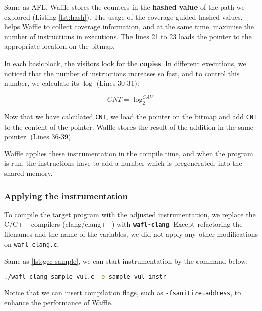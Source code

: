 Same as AFL, Waffle stores the counters in the \textbf{hashed value} of the path we explored (Listing \ref{lst:hash}). The usage of the coverage-guided hashed values, helps Waffle to collect coverage information, and at the same time, maximise the number of instructions in executions. The lines 21 to 23 loads the pointer to the appropriate location on the bitmap.

In each basicblock, the visitors look for the \textbf{copies}. In different executions, we noticed that the number of instructions increases so fast, and to control this number, we calculate its $\log$ (Lines 30-31):

\begin{equation}
  \label{eq:log}
  CNT = \log_{2}^{CAV} 
\end{equation}

Now that we have calculated \texttt{CNT}, we load the pointer on the bitmap and add \texttt{CNT} to the content of the pointer. Waffle stores the result of the addition in the same pointer. (Lines 36-39)

Waffle applies these instrumentation in the compile time, and when the program is run, the instructions have to add a number which is pregenerated, into the shared memory.

\subsubsection*{Applying the instrumentation}

To compile the target program with the adjusted instrumentation, we replace the C/C++ compilers (clang/clang++) with \textbf{\texttt{wafl-clang}}.  \cite{clang-fast} Except refactoring the filenames and the name of the variables, we did not apply any other modifications on \texttt{wafl-clang.c}.

Same as \ref{lst:gcc-sample}, we can start instrumentation by the command below:

\begin{lstlisting}[language=bash,style=CommandStyle,label={lst:wafl-clang}]
  ./wafl-clang sample_vul.c -o sample_vul_instr
\end{lstlisting}

Notice that we can insert compilation flags, such as \texttt{-fsanitize=address}, to enhance the performance of Waffle.
